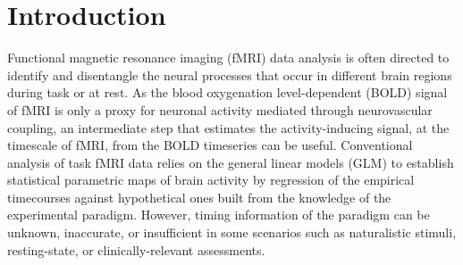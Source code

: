 
\section{Introduction}








Functional magnetic resonance imaging (fMRI) data analysis is often directed to identify and disentangle the neural processes that occur in different brain regions during task or at rest. As the blood oxygenation level-dependent (BOLD) signal of fMRI is only a proxy for neuronal activity mediated through neurovascular coupling, an intermediate step that estimates the activity-inducing signal, at the timescale of fMRI, from the BOLD timeseries can be useful. Conventional analysis of task fMRI data relies on the general linear models (GLM) to establish statistical parametric maps of brain activity by regression of the empirical timecourses against hypothetical ones built from the knowledge of the experimental paradigm. However, timing information of the paradigm can be unknown, inaccurate, or insufficient in some scenarios such as naturalistic stimuli, resting-state, or clinically-relevant assessments.

